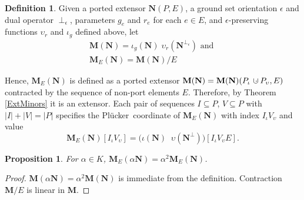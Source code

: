 \documentclass[12pt]{article}
\newtheorem{proposition}[theorem]{Proposition}
\theoremstyle{definition}
\newtheorem{definition}[theorem]{Definition}
\newcommand{\dunion}
{\mbox{\hbox{\hskip6pt$\cdot$\hskip-5.50pt$\cup$\hskip2pt}}}
\newcommand{\epsilonfun}{\ensuremath{\epsilon}}
\newcommand{\Is}{\ensuremath{\iota}}
\newcommand{\Vs}{\ensuremath{\upsilon}}
\newcommand{\FieldK}{\ensuremath{K}}
\newcommand{\ext}[1]{\ensuremath{\mathbf{#1}}}
\newcommand{\Plucker}{Pl\"{u}cker\ }
\begin{document}
\begin{definition}
\label{DefM}
Given 
a ported extensor \(\ext{N}(P,E)\),
a ground set orientation \(\epsilonfun\) and dual operator
$\perp_\epsilon$,
parameters \(g_e\) and \(r_e\) for each 
\(e\in E\), and 
\(\epsilonfun\)-preserving functions $\Vs_r$ and $\Is_g$ defined 
above, let
\begin{equation}
\begin{split}
\label{MENDef}
\ext{M}(\ext{N}) = \Is_{g}(\ext{N})\;\Vs_{r}(\ext{N}^{\perp_\epsilon})
\text{ and }\\
\ext{M}_E(\ext{N}) =
 \ext{M}(\ext{N})/E
\end{split}
\end{equation}
\end{definition}

Hence, $\ext{M}_E(\ext{N})$ is defined as a ported extensor
$\ext{M}(\ext{N})=\ext{M}(\ext{N})(P_\Is\dunion P_\Vs,E)$ 
contracted by the sequence 
of non-port elements $E$.  Therefore, 
by Theorem \ref{ExtMinors}
it is an extensor.  
Each pair of sequences
$I\subseteq P$, $V\subseteq P$ with $|I|+|V|=|P|$
specifies the \Plucker coordinate
of $\ext{M}_E(\ext{N})$ 
with index $I_\Is V_\Vs$ and value 
\begin{equation}
\label{MENComponentDef}
\ext{M}_E(\ext{N})[I_{\Is}V_{\Vs}] 
      = \big(\Is(\ext{N})\;\;\Vs(\ext{N}^\perp)\big)[I_{\Is}V_{\Vs}E].
\end{equation}

\begin{proposition} 
\label{PropostionAlphaSquared}
For $\alpha\in\FieldK$, 
$\ext{M}_E(\alpha \ext{N}) = \alpha^2 \ext{M}_E(\ext{N})$.
\end{proposition}
\begin{proof} 
$\ext{M}(\alpha \ext{N}) = \alpha^2 \ext{M}(\ext{N})$ is immediate
from the definition. Contraction $\ext{M}/E$ is linear in 
$\ext{M}$.
\end{proof}
\end{document}
